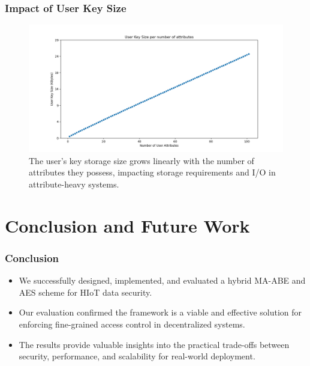\documentclass{beamer}
\begin{document}
\begin{frame}
\frametitle{Impact of User Key Size}
\begin{figure}
\includegraphics[width=\textwidth,height=0.75\textheight,keepaspectratio]{images/key_size_analysis/user_key_size_analysis.png}
\caption{The user's key storage size grows linearly with the number of attributes they possess, impacting storage requirements and I/O in attribute-heavy systems.}
\end{figure}
\end{frame}

\section{Conclusion and Future Work}

\begin{frame}
\frametitle{Conclusion}
\begin{itemize}
    \item We successfully designed, implemented, and evaluated a hybrid MA-ABE and AES scheme for HIoT data security.
    \item Our evaluation confirmed the framework is a viable and effective solution for enforcing fine-grained access control in decentralized systems.
    \item The results provide valuable insights into the practical trade-offs between security, performance, and scalability for real-world deployment.
\end{itemize}
\end{frame}
\end{document}
